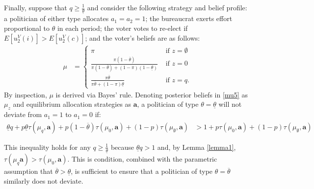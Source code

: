 \documentclass[11pt,english]{article}
\begin{document}
Finally, suppose that $q \geq \frac{1}{\underline{\theta}}$ and consider the following strategy and belief profile: a politician of either type allocates $a_1 = a_2 = 1$; the bureaucrat exerts effort proportional to $\theta$ in each period; the voter votes to re-elect if $E[u_2^V(i)] > E[u_2^V(c)]$; and the voter's beliefs are as follows:
\begin{align}\label{mu5}
\mu &= \begin{cases}
\pi & \text{ if }z = \emptyset\\
\frac{\pi(1-\overline{\theta})}{\pi(1-\overline{\theta}) + (1-\pi)(1-\underline{\theta})} & \text{ if }z = 0\\
\frac{\pi \overline{\theta}}{\pi \overline{\theta} + (1-\pi)\underline{\theta}} & \text{ if }z = q.
\end{cases}
\end{align}
By inspection, $\mu$ is derived via Bayes' rule. Denoting posterior beliefs in \eqref{mu5} as $\mu_z$ and  equilibrium allocation strategies as $\boldsymbol{a}$, a politician of type $\theta = \underline{\theta}$ will not deviate from $a_1 = 1$ to $a_1 = 0$ if:
\begin{align*}
\underline{\theta}q + p\underline{\theta}\tau(\mu_q, \boldsymbol{a}) + p(1-\overline{\theta})\tau(\mu_0, \boldsymbol{a}) + (1-p) \tau(\mu_\emptyset, \boldsymbol{a}) & > 1 + p\tau(\mu_0, \boldsymbol{a}) + (1-p) \tau(\mu_\emptyset, \boldsymbol{a})&
\end{align*}

\noindent This inequality holds for any $q \geq \frac{1}{\underline{\theta}}$ because $\underline{\theta}q > 1$ and, by Lemma \ref{lemma1}, $\tau(\mu_q \boldsymbol{a}) > \tau(\mu_0, \boldsymbol{a})$. This is condition, combined with the parametric assumption that $\overline{\theta} > \underline{\theta}$, is sufficient to ensure that a politician of type $\theta = \overline{\theta}$ similarly does not deviate. \\
\end{document}
